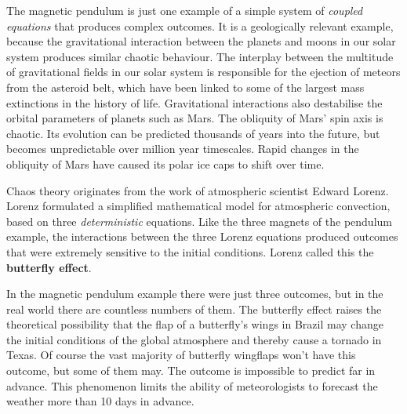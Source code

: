 The magnetic pendulum is just one example of a simple system of
\emph{coupled equations} that produces complex outcomes. It is a
geologically relevant example, because the gravitational interaction
between the planets and moons in our solar system produces similar
chaotic behaviour.  The interplay between the multitude of
gravitational fields in our solar system is responsible for the
ejection of meteors from the asteroid belt, which have been linked to
some of the largest mass extinctions in the history of
life. Gravitational interactions also destabilise the orbital
parameters of planets such as Mars. The obliquity of Mars' spin axis
is chaotic. Its evolution can be predicted thousands of years into the
future, but becomes unpredictable over million year timescales. Rapid
changes in the obliquity of Mars have caused its polar ice caps to
shift over time.\medskip

Chaos theory originates from the work of atmospheric scientist Edward
Lorenz. Lorenz formulated a simplified mathematical model for
atmospheric convection, based on three \emph{deterministic} equations.
Like the three magnets of the pendulum example, the interactions
between the three Lorenz equations produced outcomes that were
extremely sensitive to the initial conditions. Lorenz called this the
\textbf{butterfly effect}.\medskip

In the magnetic pendulum example there were just three outcomes, but
in the real world there are countless numbers of them. The butterfly
effect raises the theoretical possibility that the flap of a
butterfly's wings in Brazil may change the initial conditions of the
global atmosphere and thereby cause a tornado in Texas. Of course the
vast majority of butterfly wingflaps won't have this outcome, but some
of them may. The outcome is impossible to predict far in advance.
This phenomenon limits the ability of meteorologists to forecast the
weather more than 10 days in advance.
